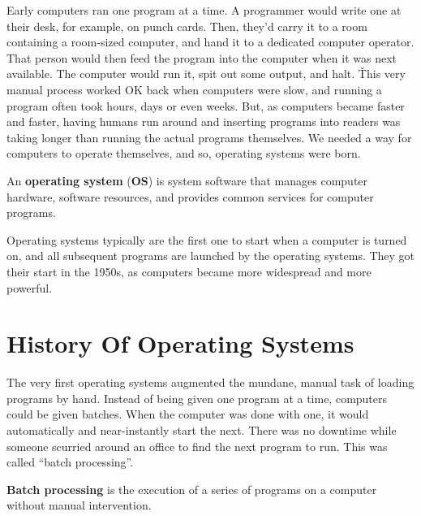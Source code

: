 Early computers ran one program at a time. A programmer would write one at their desk, for example, on punch cards.
Then, they'd carry it to a room containing a room-sized computer, and hand it to a dedicated computer operator. That
person would then feed the program into the computer when it was next available. The computer would run it, spit out
some output, and halt. \v

This very manual process worked OK back when computers were slow, and running a program often took hours, days or
even weeks. But, as computers became faster and faster, having humans run around and inserting programs into readers
was taking longer than running the actual programs themselves. We needed a way for computers to operate themselves,
and so, operating systems were born.

An \textbf{operating system} (\textbf{OS}) is system software that manages computer hardware, software resources, and
provides common services for computer programs.
\ed

Operating systems typically are the first one to start when a computer is turned on, and all subsequent programs are
launched by the operating systems. They got their start in the 1950s, as computers became more widespread and more
powerful.

\section{History Of Operating Systems}

The very first operating systems augmented the mundane, manual task of loading programs by hand. Instead of being
given one program at a time, computers could be given batches. When the computer was done with one, it would
automatically and near-instantly start the next. There was no downtime while someone scurried around an office to
find the next program to run. This was called ``batch processing''.

\textbf{Batch processing} is the execution of a series of programs on a computer without manual intervention.
\ed

